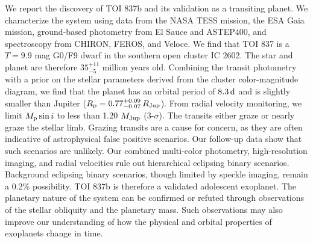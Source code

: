 We report the discovery of TOI 837b and its validation as a transiting planet.  We characterize the system using data from the NASA TESS mission, the ESA Gaia mission, ground-based photometry from El Sauce and ASTEP400, and spectroscopy from CHIRON, FEROS, and Veloce.  We find that TOI 837 is a $T=9.9$ mag G0/F9 dwarf in the southern open cluster IC 2602.  The star and planet are therefore $35^{+11}_{-5}$ million years old.  Combining the transit photometry with a prior on the stellar parameters derived from the cluster color-magnitude diagram, we find that the planet has an orbital period of $8.3\,{\rm d}$ and is slightly smaller than Jupiter ($R_{\rm p} = 0.77^{+0.09}_{-0.07} \,R_{\rm Jup}$).  From radial velocity monitoring, we limit $M_{\rm p}\sin i$ to less than 1.20 $M_{\rm Jup}$ (3-$\sigma$).  The transits either graze or nearly graze the stellar limb.  Grazing transits are a cause for concern, as they are often indicative of astrophysical false positive scenarios.  Our follow-up data show that such scenarios are unlikely.  Our combined multi-color photometry, high-resolution imaging, and radial velocities rule out hierarchical eclipsing binary scenarios.  Background eclipsing binary scenarios, though limited by speckle imaging, remain a 0.2\% possibility.  TOI 837b is therefore a validated adolescent exoplanet.  The planetary nature of the system can be confirmed or refuted through observations of the stellar obliquity and the planetary mass.  Such observations may also improve our understanding of how the physical and orbital properties of exoplanets change in time.
